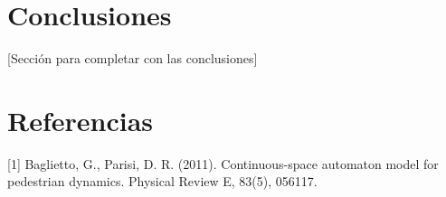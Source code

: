 \documentclass[12pt]{article}
\begin{document}
\section{Conclusiones}
[Sección para completar con las conclusiones]

\section{Referencias}
[1] Baglietto, G., Parisi, D. R. (2011). Continuous-space automaton model for pedestrian dynamics. Physical Review E, 83(5), 056117.
\end{document}
